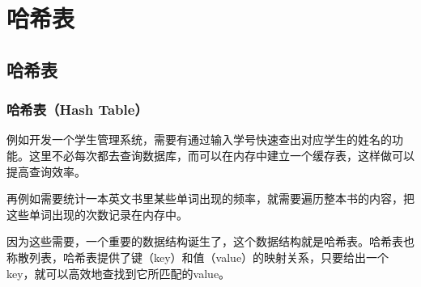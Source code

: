 \chapter{哈希表}

\section{哈希表}

\subsection{哈希表（Hash Table）}

例如开发一个学生管理系统，需要有通过输入学号快速查出对应学生的姓名的功能。这里不必每次都去查询数据库，而可以在内存中建立一个缓存表，这样做可以提高查询效率。

\begin{table}[H]
	\centering
	\caption{学生名单}
\end{table}

再例如需要统计一本英文书里某些单词出现的频率，就需要遍历整本书的内容，把这些单词出现的次数记录在内存中。

\begin{table}[H]
	\centering
	\caption{词频统计}
\end{table}

因为这些需要，一个重要的数据结构诞生了，这个数据结构就是哈希表。哈希表也称散列表，哈希表提供了键（key）和值（value）的映射关系，只要给出一个key，就可以高效地查找到它所匹配的value。 \\

